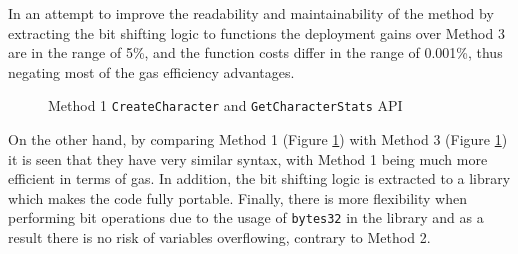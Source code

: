 In an attempt to improve the readability and maintainability of the method by extracting the bit shifting logic to functions the deployment gains over Method 3 are in the range of 5\%, and the function costs differ in the range of 0.001\%, thus negating most of the gas efficiency advantages.

\begin{figure}[ht!]
    \caption{Method 1 \texttt{CreateCharacter} and \texttt{GetCharacterStats} API}
    \label{fig:method1}
\end{figure}

On the other hand, by comparing Method 1 (Figure \ref{fig:method1}) with Method 3 (Figure \ref{fig:method1}) it is seen that they have very similar syntax, with Method 1 being much more efficient in terms of gas. In addition, the bit shifting logic is extracted to a library which makes the code fully portable. Finally, there is more flexibility when performing bit operations due to the usage of \texttt{bytes32} in the library and as a result there is no risk of variables overflowing, contrary to Method 2.


